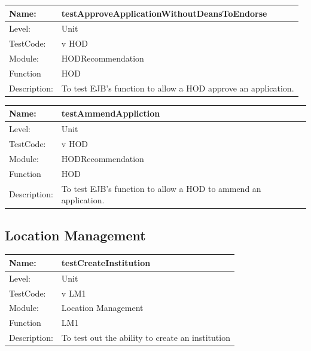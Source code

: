 \documentclass[12pt]{article}
\begin{document}
\begin{center}
\begin{tabular}{|l|p{12cm}|}
\hline

 Name: & testApproveApplicationWithoutDeansToEndorse  \\
\hline
Level: & Unit \\
\hline
TestCode: & v HOD \\
\hline
Module:& HODRecommendation \\
\hline
Function & HOD \\
\hline
Description: & To test EJB's function to allow a HOD approve an application. \\
\hline
\end{tabular}
\end{center}


\begin{center}
\begin{tabular}{|l|p{12cm}|}
\hline

 Name: & testAmmendAppliction  \\
\hline
Level: & Unit \\
\hline
TestCode: & v HOD \\
\hline
Module:& HODRecommendation \\
\hline
Function & HOD \\
\hline
Description: & To test EJB's function to allow a HOD to ammend an application. \\
\hline
\end{tabular}
\end{center}

\subsection{Location Management}
\begin{center}
\begin{tabular}{|l|p{12cm}|}
\hline

 Name: & testCreateInstitution\\
 \hline
Level: & Unit \\
\hline
TestCode: & v LM1 \\
\hline
Module:& Location Management \\
\hline
Function & LM1 \\
\hline
Description: & To test out the ability to create an institution  \\
\hline
\end{tabular}
\end{center}
\end{document}
